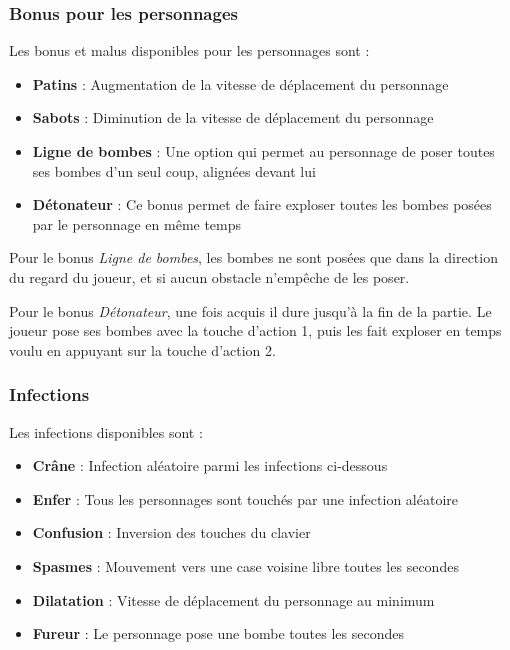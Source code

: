 \subsubsection{Bonus pour les personnages}

Les bonus et malus disponibles pour les personnages sont :
\begin{itemize}
\item \textbf{Patins} : Augmentation de la vitesse de déplacement du personnage
\item \textbf{Sabots} : Diminution de la vitesse de déplacement du personnage
\item \textbf{Ligne de bombes} : Une option qui permet au personnage de poser toutes ses bombes d'un seul coup, alignées devant lui
\item \textbf{Détonateur} : Ce bonus permet de faire exploser toutes les bombes posées par le personnage en même temps
\end{itemize}

\vspace{0.3cm}

Pour le bonus \textit{Ligne de bombes}, les bombes ne sont posées que dans la direction du regard du joueur, et si aucun obstacle n'empêche de les poser. 

Pour le bonus \textit{Détonateur}, une fois acquis il dure jusqu'à la fin de la partie. Le joueur pose ses bombes avec la touche d'action 1, puis les fait exploser en temps voulu en appuyant sur la touche d'action 2.

\subsubsection{Infections}

Les infections disponibles sont :
\begin{itemize}
\item \textbf{Crâne} : Infection aléatoire parmi les infections ci-dessous
\item \textbf{Enfer} : Tous les personnages sont touchés par une infection aléatoire
\item \textbf{Confusion} : Inversion des touches du clavier
\item \textbf{Spasmes} : Mouvement vers une case voisine libre toutes les \nbSecondes secondes
\item \textbf{Dilatation} : Vitesse de déplacement du personnage au minimum
\item \textbf{Fureur} : Le personnage pose une bombe toutes les \nbSecondes secondes
\end{itemize}

